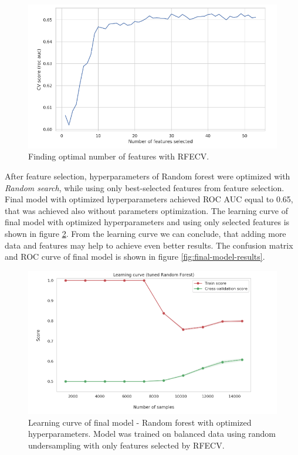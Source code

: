 \documentclass[runningheads]{llncs}
\begin{document}
\begin{figure}[h]
    \centering
    \includegraphics[width=\linewidth]{figures/feature_selection.png}
    \caption{Finding optimal number of features with RFECV.}
    \label{fig:feature-selection}
\end{figure}

After feature selection, hyperparameters of Random forest were optimized with \textit{Random search}, while using only best-selected features from feature selection. Final model with optimized hyperparameters achieved ROC AUC equal to 0.65, that was achieved also without parameters optimization. The learning curve of final model with optimized hyperparameters and using only selected features is shown in figure \ref{fig:learning-curve}. From the learning curve we can conclude, that adding more data and features may help to achieve even better results. The confusion matrix and ROC curve of final model is shown in figure \ref{fig:final-model-results}.

\begin{figure}[h]
    \centering
    \includegraphics[width=0.9\linewidth]{figures/learning_curve.png}
    \caption{Learning curve of final model - Random forest with optimized hyperparameters. Model was trained on balanced data using random undersampling with only features selected by RFECV.}
    \label{fig:learning-curve}
\end{figure}
\end{document}
